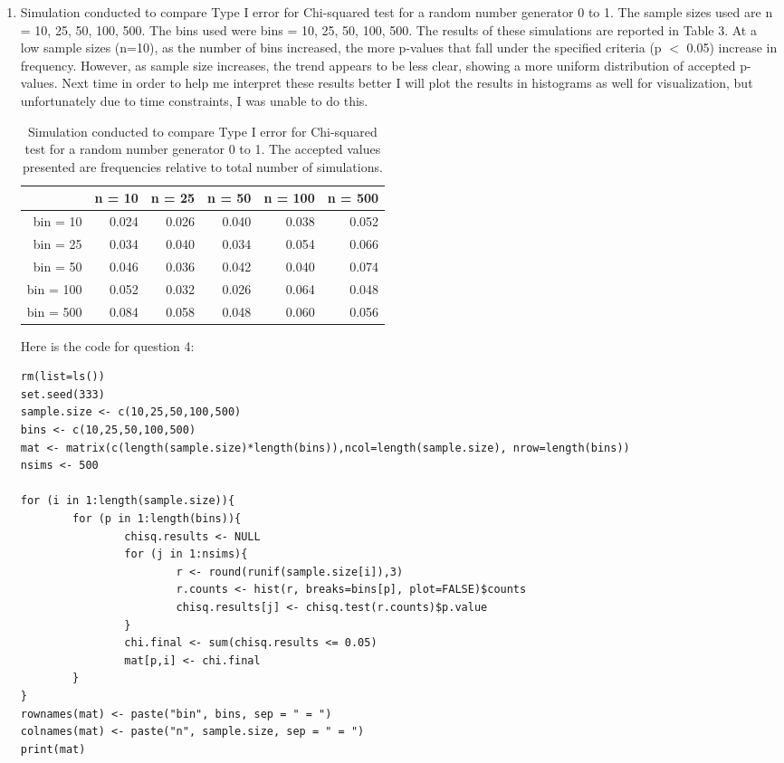 \documentclass{article}
\begin{document}
\begin{enumerate}
\pagebreak

\item Simulation conducted to compare Type I error for Chi-squared test for a random number generator 0 to 1. The sample sizes used are n = 10, 25, 50, 100, 500. The bins used were bins = 10, 25, 50, 100, 500. The results of these simulations are reported in Table 3.  At a low sample sizes (n=10), as the number of bins increased, the more p-values that fall under the specified criteria (p $<$ 0.05) increase in frequency. However, as sample size increases, the trend appears to be less clear, showing a more uniform distribution of accepted p-values. Next time in order to help me interpret these results better I will plot the results in histograms as well for visualization, but unfortunately due to time constraints, I was unable to do this.
\begin{table}[ht]
\centering
\caption{Simulation conducted to compare Type I error for Chi-squared test for a random number generator 0 to 1. The accepted values presented are frequencies relative to total number of simulations.}
\begin{tabular}{rrrrrr}
  \hline
 & n = 10 & n = 25 & n = 50 & n = 100 & n = 500 \\ 
  \hline
bin = 10 & 0.024 & 0.026 & 0.040 & 0.038 & 0.052 \\ 
  bin = 25 & 0.034 & 0.040 & 0.034 & 0.054 & 0.066 \\ 
  bin = 50 & 0.046 & 0.036 & 0.042 & 0.040 & 0.074 \\ 
  bin = 100 & 0.052 & 0.032 & 0.026 & 0.064 & 0.048 \\ 
  bin = 500 & 0.084 & 0.058 & 0.048 & 0.060 & 0.056 \\ 
   \hline
\end{tabular}
\end{table}

Here is the code for question 4:
\begin{verbatim}
rm(list=ls())
set.seed(333)
sample.size <- c(10,25,50,100,500)
bins <- c(10,25,50,100,500)
mat <- matrix(c(length(sample.size)*length(bins)),ncol=length(sample.size), nrow=length(bins))
nsims <- 500

for (i in 1:length(sample.size)){
        for (p in 1:length(bins)){
                chisq.results <- NULL             
                for (j in 1:nsims){
                        r <- round(runif(sample.size[i]),3)
                        r.counts <- hist(r, breaks=bins[p], plot=FALSE)$counts 
                        chisq.results[j] <- chisq.test(r.counts)$p.value
                }
                chi.final <- sum(chisq.results <= 0.05)
                mat[p,i] <- chi.final
        }
}
rownames(mat) <- paste("bin", bins, sep = " = ")
colnames(mat) <- paste("n", sample.size, sep = " = ")
print(mat)
\end{verbatim}
\end{enumerate}
\end{document}
